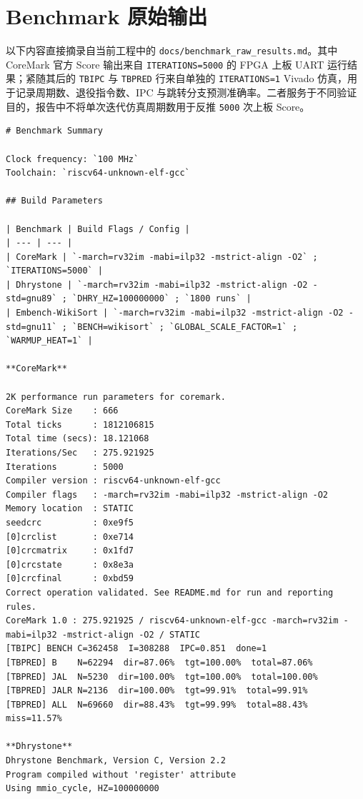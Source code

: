 ﻿\documentclass[UTF8,a4paper,12pt]{ctexart}
\begin{document}
\appendix
\section{Benchmark 原始输出}

以下内容直接摘录自当前工程中的 \texttt{docs/benchmark\_raw\_results.md}。其中 CoreMark 官方 Score 输出来自 \texttt{ITERATIONS=5000} 的 FPGA 上板 UART 运行结果；紧随其后的 \texttt{TBIPC} 与 \texttt{TBPRED} 行来自单独的 \texttt{ITERATIONS=1} Vivado 仿真，用于记录周期数、退役指令数、IPC 与跳转分支预测准确率。二者服务于不同验证目的，报告中不将单次迭代仿真周期数用于反推 \texttt{5000} 次上板 Score。

\begin{Verbatim}[fontsize=\small,breaklines=true]
# Benchmark Summary

Clock frequency: `100 MHz`  
Toolchain: `riscv64-unknown-elf-gcc`

## Build Parameters

| Benchmark | Build Flags / Config |
| --- | --- |
| CoreMark | `-march=rv32im -mabi=ilp32 -mstrict-align -O2` ; `ITERATIONS=5000` |
| Dhrystone | `-march=rv32im -mabi=ilp32 -mstrict-align -O2 -std=gnu89` ; `DHRY_HZ=100000000` ; `1800 runs` |
| Embench-WikiSort | `-march=rv32im -mabi=ilp32 -mstrict-align -O2 -std=gnu11` ; `BENCH=wikisort` ; `GLOBAL_SCALE_FACTOR=1` ; `WARMUP_HEAT=1` |

**CoreMark**

2K performance run parameters for coremark.
CoreMark Size    : 666
Total ticks      : 1812106815
Total time (secs): 18.121068
Iterations/Sec   : 275.921925
Iterations       : 5000
Compiler version : riscv64-unknown-elf-gcc
Compiler flags   : -march=rv32im -mabi=ilp32 -mstrict-align -O2
Memory location  : STATIC
seedcrc          : 0xe9f5
[0]crclist       : 0xe714
[0]crcmatrix     : 0x1fd7
[0]crcstate      : 0x8e3a
[0]crcfinal      : 0xbd59
Correct operation validated. See README.md for run and reporting rules.
CoreMark 1.0 : 275.921925 / riscv64-unknown-elf-gcc -march=rv32im -mabi=ilp32 -mstrict-align -O2 / STATIC
[TBIPC] BENCH C=362458  I=308288  IPC=0.851  done=1
[TBPRED] B    N=62294  dir=87.06%  tgt=100.00%  total=87.06%
[TBPRED] JAL  N=5230  dir=100.00%  tgt=100.00%  total=100.00%
[TBPRED] JALR N=2136  dir=100.00%  tgt=99.91%  total=99.91%
[TBPRED] ALL  N=69660  dir=88.43%  tgt=99.99%  total=88.43%  miss=11.57%

**Dhrystone**
Dhrystone Benchmark, Version C, Version 2.2
Program compiled without 'register' attribute
Using mmio_cycle, HZ=100000000


\end{Verbatim}
\end{document}

